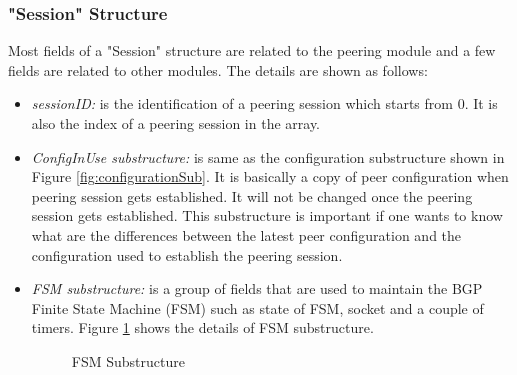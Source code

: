 \subsubsection{"Session" Structure}
\label{sec:peering:sessionstructure}
Most fields of a "Session" structure are related to the peering module and a few fields are related to other modules. The details are shown as follows:
\begin{itemize}

\item{\emph{sessionID:} is the identification of a peering session which starts from 0. It is also the index of a peering session in the array.}

\item{\emph{ConfigInUse substructure:} is same as the configuration substructure shown in Figure \ref{fig:configurationSub}.   It is basically a copy of peer configuration when peering session gets established. It will not be changed once the peering session gets established. This substructure is important if one wants to know what are the differences between the latest peer configuration and the configuration used to establish the peering session.}

\item{\emph{FSM substructure:} is a group of fields that are used to maintain the BGP Finite State Machine (FSM) such as state of FSM, socket and a couple of timers. Figure \ref{fig:FSMSub} shows the details of FSM substructure.}
\begin{figure}
\centering
{}
\caption{FSM Substructure}
\label{fig:FSMSub}
\end{figure}


\end{itemize}
